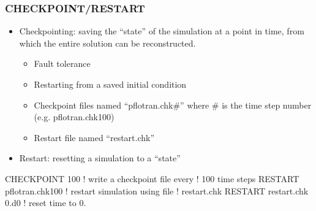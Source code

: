 \documentclass{beamer}
\newcommand\redcomment[1]{{{\color{red} #1}}}
\newcommand\bluecomment[1]{{{\color{blue} #1}}}
\begin{document}
\begin{frame}[fragile]\frametitle{CHECKPOINT/RESTART}

\begin{itemize}
\item Checkpointing: saving the ``state'' of the simulation at a point in time, from which the entire solution can be reconstructed.
  \begin{itemize}
    \item Fault tolerance
    \item Restarting from a saved initial condition
    \item Checkpoint files named ``pflotran.chk\#'' where \# is the time step number (e.g. pflotran.chk100)
    \item Restart file named ``restart.chk''
  \end{itemize}
\item Restart: resetting a simulation to a ``state''
\end{itemize}


\begin{semiverbatim}

CHECKPOINT 100          \bluecomment{! write a checkpoint file every}
                        \bluecomment{!   100 time steps}
RESTART pflotran.chk100 \bluecomment{! restart simulation using file}
                        \bluecomment{!   \redcomment{restart.chk}}
RESTART restart.chk \redcomment{0.d0}  \bluecomment{! reset time to 0.}
\end{semiverbatim}

\end{frame}
\end{document}
